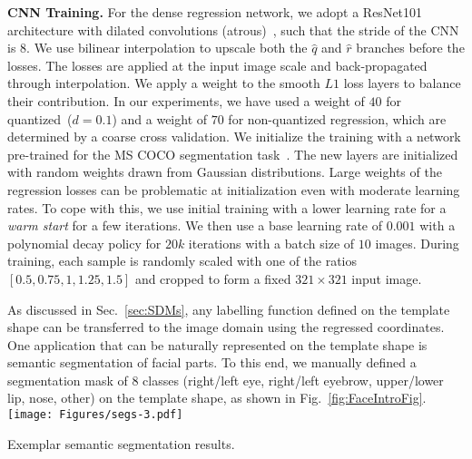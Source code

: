 \documentclass[10pt,twocolumn,letterpaper]{article}
\begin{document}
\textbf{CNN Training.} For the dense regression network, we adopt a ResNet101~\cite{He2015} architecture with dilated convolutions (atrous)~\cite{CP2015Semantic,mallat1999wavelet}, such that the stride of the CNN is $8$. We use bilinear interpolation to upscale both the $\hat{q}$ and $\hat{r}$ branches before the losses. The losses are applied at the input image scale and back-propagated through interpolation. We apply a weight to the smooth $L1$ loss layers to balance their contribution. In our experiments, we have used a weight of $40$ for quantized~($d=0.1$) and a weight of $70$ for non-quantized regression, which are determined by a coarse cross validation. We initialize the training with a network pre-trained for the MS COCO segmentation task~\cite{lin2014microsoft}. The new layers are initialized with random weights drawn from Gaussian distributions. Large weights of the regression losses can be problematic at initialization even with moderate learning rates. To cope with this, we use initial training with a lower learning rate for a \textit{warm start} for a few iterations. We then use a base learning rate of $0.001$ with a polynomial decay policy for $20k$ iterations with a batch size of $10$ images. During training, each sample is randomly scaled with one of the ratios $[0.5, 0.75, 1, 1.25, 1.5]$ and cropped to form a fixed $321\times321$ input image.


As discussed in Sec.~\ref{sec:SDMs}, any labelling function defined on the template shape can be transferred to the image domain using the regressed coordinates. One application that can be naturally represented on the template shape is semantic segmentation of facial parts. 
To this end, we manually defined a segmentation mask of $8$ classes  (right/left eye, right/left eyebrow, upper/lower lip, nose, other) on the template shape, as shown in Fig.~\ref{fig:FaceIntroFig}. 
\vspace{-0.25cm}
\centering
\texttt{[image: Figures/segs-3.pdf]}
\caption{Exemplar semantic segmentation results.}
\label{fig:Semantic}
\vspace{-0.25cm}
\end{document}
